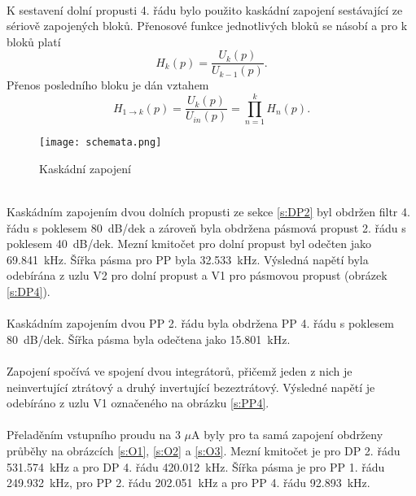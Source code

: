 \\
\noindent K sestavení dolní propusti 4. řádu bylo použito kaskádní zapojení sestávající ze sériově zapojených bloků. Přenosové funkce jednotlivých bloků se násobí a pro k bloků platí
\begin{equation}
H_k(p) = \frac{U_k (p)}{U_{k-1}(p)}.
\end{equation}
Přenos posledního bloku je dán vztahem
\begin{equation}
H_{1 \rightarrow k}(p) = \frac{U_k (p)}{U_{in}(p)} = \prod _{n=1}^{k} H_n(p).
\end{equation}
\begin{figure}[h]
\centering
\texttt{[image: schemata.png]}
\caption[Kaskádní zapojení]{Kaskádní zapojení \cite{9}}
\end{figure}
\\
\noindent Kaskádním zapojením dvou dolních propusti ze sekce \ref{s:DP2} byl obdržen filtr 4. řádu s poklesem 80~dB/dek a zároveň byla obdržena pásmová propust 2. řádu s poklesem 40~dB/dek. Mezní kmitočet pro dolní propust byl odečten jako 69.841~kHz. Šířka pásma pro PP byla 32.533~kHz. Výsledná napětí byla odebírána z uzlu V2 pro dolní propust a V1 pro pásmovou propust (obrázek \ref{s:DP4}). \\
\\
\noindent Kaskádním zapojením dvou PP 2. řádu byla obdržena PP 4. řádu s poklesem 80~dB/dek. Šířka pásma byla odečtena jako 15.801~kHz.\\ 
\\
Zapojení spočívá ve spojení dvou integrátorů, přičemž jeden z nich je neinvertující ztrátový a druhý invertující bezeztrátový. Výsledné napětí je odebíráno z uzlu V1 označeného na obrázku \ref{s:PP4}.\\
\\
\noindent Přeladěním vstupního proudu na 3 $\mu$A byly pro ta samá zapojení obdrženy průběhy na obrázcích \ref{s:O1}, \ref{s:O2} a  \ref{s:O3}. Mezní kmitočet je pro DP 2. řádu 531.574~kHz a pro DP 4. řádu 420.012~kHz. Šířka pásma je pro PP 1. řádu 249.932~kHz, pro PP 2. řádu 202.051~kHz a pro PP 4. řádu 92.893~kHz.